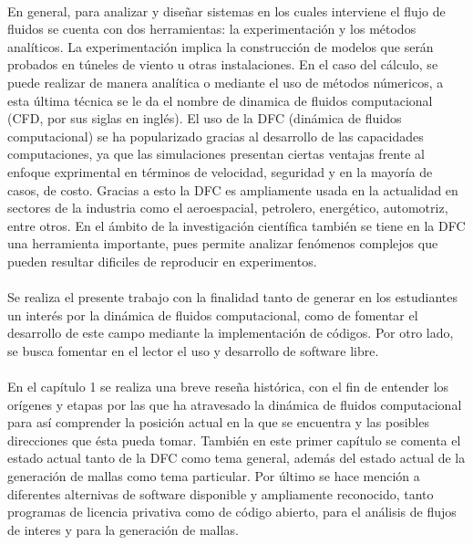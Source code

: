 \documentclass[letterpaper, openright, 12pt]{book}
\begin{document}
    \paragraph*{}
    En general, para analizar y diseñar sistemas en los cuales interviene el
    flujo de fluidos se cuenta con dos herramientas: la experimentación y los
    métodos analíticos. La experimentación implica la construcción de modelos
    que serán probados en túneles de viento u otras instalaciones. En el caso
    del cálculo, se puede realizar de manera analítica o mediante el uso de
    métodos númericos, a esta última técnica se le da el nombre de dinamica de
    fluidos computacional (CFD, por sus siglas en inglés). El uso de la DFC
    (dinámica de fluidos computacional) se ha popularizado gracias al
    desarrollo de las capacidades computaciones, ya que las simulaciones
    presentan ciertas ventajas frente al enfoque exprimental en términos de
    velocidad, seguridad y en la mayoría de casos, de costo. Gracias a esto la
    DFC es ampliamente usada en la actualidad en sectores de la industria como
    el aeroespacial, petrolero, energético, automotriz, entre otros. En el
    ámbito de la investigación científica también se tiene en la DFC una
    herramienta importante, pues permite analizar fenómenos complejos que
    pueden resultar dificiles de reproducir en experimentos.

    \paragraph*{}
    Se realiza el presente trabajo con la finalidad tanto de generar en los
    estudiantes un interés por la dinámica de fluidos computacional, como
    de fomentar el desarrollo de este campo mediante la implementación de
    códigos. Por otro lado, se busca fomentar en el lector el uso y desarrollo
    de software libre.

    \paragraph*{}
    En el capítulo 1 se realiza una breve reseña histórica, con el fin de
    entender los orígenes y etapas por las que ha atravesado la dinámica de
    fluidos computacional para así comprender la posición actual en la que se
    encuentra y las posibles direcciones que ésta pueda tomar. También en este
    primer capítulo se comenta el estado actual tanto de la DFC como tema
    general, además del estado actual de la generación de mallas como tema
    particular. Por último se hace mención a diferentes alternivas de software
    disponible y ampliamente reconocido, tanto programas de licencia privativa
    como de código abierto, para el análisis de flujos de interes y para la
    generación de mallas.
\end{document}
